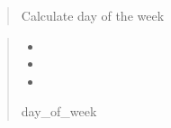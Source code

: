 \documentclass[letterpaper,10pt,english]{sphinxmanual}
\begin{document}
\begin{fulllineitems}
\label{\detokenize{Oefeningen:Oefeningen.Kalender.calculate_day_of_week}}
\pysigstartsignatures
{}
\pysigstopsignatures\begin{quote}

\sphinxAtStartPar
Calculate day of the week
\end{quote}
\begin{quote}\begin{description}
\begin{itemize}
\item {} 
\sphinxAtStartPar
{}

\item {} 
\sphinxAtStartPar
{}

\item {} 
\sphinxAtStartPar
{}

\end{itemize}

\sphinxAtStartPar
day\_of\_week

\end{description}\end{quote}

\end{fulllineitems}

\end{document}

